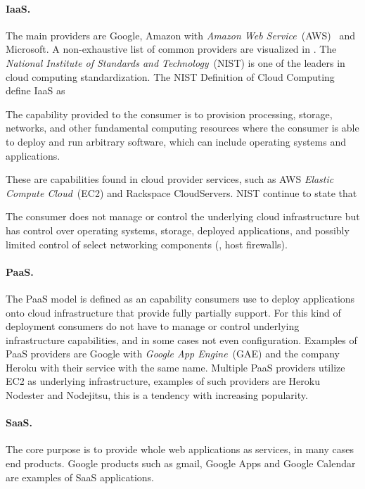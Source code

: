\paragraph{IaaS.}
The main providers are Google, Amazon with \emph{Amazon Web Service}~(AWS)~\cite{aws} and Microsoft.
A non-exhaustive list of common providers are visualized in .
The \emph{National Institute of Standards and Technology}~(NIST) is one of 
the leaders in cloud computing standardization.
The NIST Definition of Cloud Computing~\cite{nist:mell11} define IaaS as
\epigraph{The capability provided to the consumer is to provision 
  processing, storage, networks, and other fundamental computing resources where the 
  consumer is able to deploy and run arbitrary software, which can include operating 
  systems and applications.
}{}
These are capabilities found in cloud provider services, 
such as AWS \emph{Elastic Compute Cloud}~(EC2) and Rackspace CloudServers.
NIST continue to state that 
\epigraph{The consumer does not manage or control the underlying cloud 
  infrastructure but has control over operating systems, storage, deployed applications, and 
  possibly limited control of select networking components (\eg, host firewalls).
}{}
\paragraph{PaaS.}
The PaaS model is defined as an capability consumers use to deploy applications onto cloud infrastructure
that provide fully partially support.
For this kind of deployment
consumers do not have to manage or control underlying infrastructure capabilities,
and in some cases not even configuration.
Examples of PaaS providers are Google with \emph{Google App Engine}~(GAE) and
the company Heroku with their service with the same name.
Multiple PaaS providers utilize EC2 as underlying infrastructure, examples of such
providers are Heroku Nodester and Nodejitsu, this is a tendency with increasing popularity.
\paragraph{SaaS.}
The core purpose is to provide whole web applications as services, in many cases end products.
Google products such as gmail, Google Apps and  Google Calendar are examples of 
SaaS applications.

